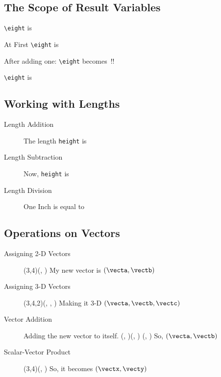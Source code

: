 \documentclass{article}
\begin{document}
	\subsection{The Scope of Result Variables}
	\verb|\eight| is \eight 
	
	{
		At First \verb|\eight| is \eight 
		
		\color{red!70}
		
		After adding one: 											\verb|\eight| becomes \eight\,!!	
	} 
	
	\noindent
	\verb|\eight| is \eight
	

	\subsection{Working with Lengths}
	\newlength{\height}
	
	\begin{description}
		\item[Length Addition]
			\LENGTHADD{1in}{50pt}{\height}
			The length \texttt{height} is \the\height
		\item[Length Subtraction]
			\LENGTHSUBTRACT{2cm}{20pt}{\height}
			Now, \texttt{height} is \the\height
		\item[Length Division]	
			\LENGTHDIVIDE{1in}{1cm}{\lenres} %
			One Inch is equal to \lenres 
	\end{description}
	
	\pagebreak
	
	\subsection{Operations on Vectors}
	
	\begin{description}
		\item[Assigning 2-D Vectors]
			\VECTORCOPY(3,4)(\vecta, \vectb) 
			My new vector is $(\vecta, \vectb)$ 
		\item[Assigning 3-D Vectors]
			\VECTORCOPY(3,4,2)(\vecta, \vectb, \vectc)
			Making it 3-D $(\vecta, \vectb, \vectc)$
		\item[Vector Addition]
			Adding the new vector to itself. 
			\VECTORADD(\vecta, \vectb)(\vecta, \vectb)%
			(\vecta, \vectb) So, $(\vecta, \vectb)$
		\item[Scalar-Vector Product]
			(3,4)(\vectx, \vecty)
			So, it becomes $(\vectx, \vecty)$ 
	\end{description}
	
\end{document}
